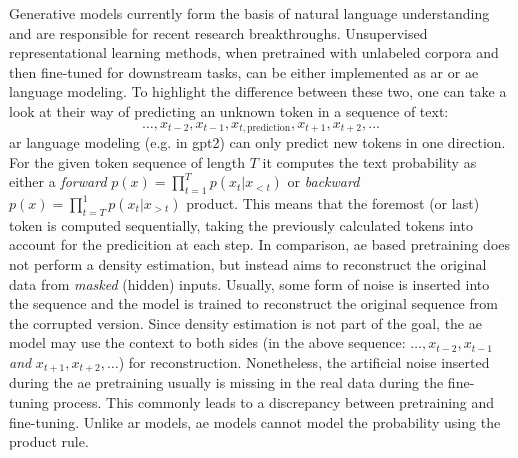 Generative models currently form the basis of natural language understanding and are responsible for recent research breakthroughs. Unsupervised representational learning methods, when pretrained with unlabeled corpora and then fine-tuned for downstream tasks, can be either implemented as \gls{ar} or \gls{ae} language modeling. To highlight the difference between these two, one can take a look at their way of predicting an unknown token in a sequence of text:
\begin{equation}
	\dots, x_{t-2}, x_{t-1}, x_{t, \text{prediction}}, x_{t+1}, x_{t+2}, \dots
\end{equation}
\gls{ar} language modeling (e.g. in \gls{gpt2}) can only predict new tokens in one direction. For the given token sequence of length $ T $ it computes the text probability as either a \textit{forward} $ p(x) = \prod_{t=1}^{T} p(x_t | x_{<t}) $ or \textit{backward} $ p(x) = \prod_{t=T}^{1} p(x_t | x_{>t}) $ product. This means that the foremost (or last) token is computed sequentially, taking the previously calculated tokens into account for the predicition at each step. In comparison, \gls{ae} based pretraining does not perform a density estimation, but instead aims to reconstruct the original data from \textit{masked} (hidden) inputs. Usually, some form of noise is inserted into the sequence and the model is trained to reconstruct the original sequence from the corrupted version. Since density estimation is not part of the goal, the \gls{ae} model may use the context to both sides (in the above sequence: $ \dots, x_{t-2}, x_{t-1} $ \textit{and} $ x_{t+1}, x_{t+2}, \dots $) for reconstruction. Nonetheless, the artificial noise inserted during the \gls{ae} pretraining usually is missing in the real data during the fine-tuning process. This commonly leads to a discrepancy between pretraining and fine-tuning. Unlike \gls{ar} models, \gls{ae} models cannot model the probability using the product rule.
